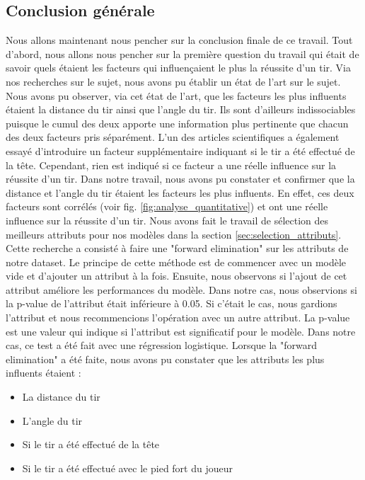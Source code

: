 \documentclass[12pt]{article}
\begin{document}
\subsection{Conclusion générale}
Nous allons maintenant nous pencher sur la conclusion finale de ce travail.
Tout d'abord, nous allons nous pencher sur la première question du travail qui était de savoir quels étaient les facteurs qui influençaient le plus la réussite d'un tir.
Via nos recherches sur le sujet, nous avons pu établir un état de l'art sur le sujet.
Nous avons pu observer, via cet état de l'art, que les facteurs les plus influents étaient la distance du tir ainsi que l'angle du tir.
Ils sont d'ailleurs indissociables puisque le cumul des deux apporte une information plus pertinente que chacun des deux facteurs pris séparément.
L'un des articles scientifiques a également essayé d'introduire un facteur supplémentaire indiquant si le tir a été effectué de la tête.
Cependant, rien est indiqué si ce facteur a une réelle influence sur la réussite d'un tir.
\newline\newline
Dans notre travail, nous avons pu constater et confirmer que la distance et l'angle du tir étaient les facteurs les plus influents.
En effet, ces deux facteurs sont corrélés (voir fig. \ref{fig:analyse_quantitative}) et ont une réelle influence sur la réussite d'un tir.
Nous avons fait le travail de sélection des meilleurs attributs pour nos modèles dans la section \ref{sec:selection_attributs}. 
Cette recherche a consisté à faire une "forward elimination" sur les attributs de notre dataset.
Le principe de cette méthode est de commencer avec un modèle vide et d'ajouter un attribut à la fois.
Ensuite, nous observons si l'ajout de cet attribut améliore les performances du modèle.
Dans notre cas, nous observions si la p-value de l'attribut était inférieure à 0.05.
Si c'était le cas, nous gardions l'attribut et nous recommencions l'opération avec un autre attribut.
La p-value est une valeur qui indique si l'attribut est significatif pour le modèle.
Dans notre cas, ce test a été fait avec une régression logistique.
Lorsque la "forward elimination" a été faite, nous avons pu constater que les attributs les plus influents étaient :
\begin{itemize}
    \item La distance du tir
    \item L'angle du tir
    \item Si le tir a été effectué de la tête
    \item Si le tir a été effectué avec le pied fort du joueur
\end{itemize}
\end{document}

